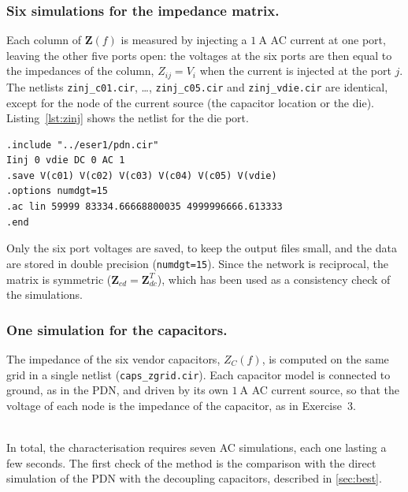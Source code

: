 \subsubsection{Six simulations for the impedance matrix.} Each column of $\mathbf{Z}(f)$ is measured by injecting a $1~\text{A}$ AC current at one port, leaving the other
five ports open: the voltages at the six ports are then equal to the impedances of the column, $Z_{ij} = V_i$ when the current is injected at the port $j$. The
netlists \texttt{zinj\_c01.cir}, \dots, \texttt{zinj\_c05.cir} and \texttt{zinj\_vdie.cir} are identical, except for the node of the current source (the capacitor
location or the die). Listing~\ref{lst:zinj} shows the netlist for the die port.

\begin{lstlisting}[language=ltspice, caption={\texttt{zinj\_vdie.cir} $\rightarrow$ injection of $1~\text{A}$ at the die port and extraction of one column of $\mathbf{Z}$.}, label={lst:zinj}]
.include "../eser1/pdn.cir"
Iinj 0 vdie DC 0 AC 1
.save V(c01) V(c02) V(c03) V(c04) V(c05) V(vdie)
.options numdgt=15
.ac lin 59999 83334.66668800035 4999996666.613333
.end
\end{lstlisting}

\noindent Only the six port voltages are saved, to keep the output files small, and the data are stored in double precision (\texttt{numdgt=15}). Since the network is
reciprocal, the matrix is symmetric ($\mathbf{Z}_{cd} = \mathbf{Z}_{dc}^{T}$), which has been used as a consistency check of the simulations.

\subsubsection{One simulation for the capacitors.} The impedance of the six vendor capacitors, $Z_{C}(f)$, is computed on the same grid in a single netlist
(\texttt{caps\_zgrid.cir}). Each capacitor model is connected to ground, as in the PDN, and driven by its own $1~\text{A}$ AC current source, so that the voltage of each
node is the impedance of the capacitor, as in Exercise~3.

\noindent\\ In total, the characterisation requires seven AC simulations, each one lasting a few seconds. The first check of the method is the comparison with the
direct simulation of the PDN with the decoupling capacitors, described in \autoref{sec:best}.

